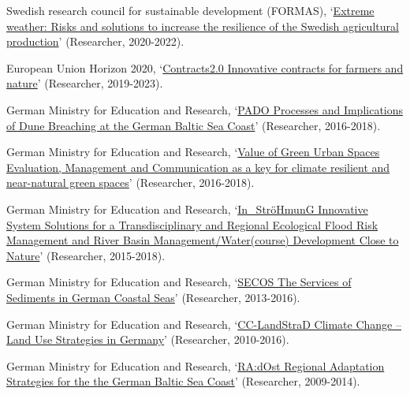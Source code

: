 \documentclass[paper=a4,fontsize=11pt]{scrartcl} %
\newcommand{\FundingEntry}[4]{
        \noindent #1, `#2' (#3, #4).}
\begin{document}
\begin{etaremune}

\item\FundingEntry {Swedish research council for sustainable development (FORMAS)}{\href{https://www.slu.se/en/departments/soil-environment/research/agricultural-water-management-/extreme-weather-and-resilience-in-swedish-agriculture/}{Extreme weather: Risks and solutions to increase the resilience of the Swedish agricultural production}}{Researcher}{2020-2022}

\item\FundingEntry {European Union Horizon 2020}{\href{www.project-contracts20.eu}{Contracts2.0 Innovative contracts for farmers and nature}}{Researcher}{2019-2023}

\item\FundingEntry {German Ministry for Education and Research}{\href{https://www.ioew.de/en/project-single/pado_processes_and_implications_of_dune_breaching_at_the_german_baltic_sea_coast/}{PADO Processes and Implications of Dune Breaching at the German Baltic Sea Coast}}{Researcher}{2016-2018}

\item\FundingEntry {German Ministry for Education and Research}{\href{https://www.ioew.de/en/project-single/value_of_green_urban_spaces/}{Value of Green Urban Spaces Evaluation, Management and Communication as a key for climate resilient and near-natural green spaces}}{Researcher}{2016-2018}


\item\FundingEntry {German Ministry for Education and Research}{\href{https://www.ioew.de/en/project-single/innovative_system_solutions_for_a_transdisciplinary_and_regional_ecological_flood_risk_management_an/}{In\_StröHmunG Innovative System Solutions for a Transdisciplinary and Regional Ecological Flood Risk Management and River Basin Management/Water(course) Development Close to Nature}}{Researcher}{2015-2018}

\item\FundingEntry {German Ministry for Education and Research}{\href{https://secos.deutsche-kuestenforschung.de/}{SECOS The Services of Sediments in German Coastal Seas}}{Researcher}{2013-2016}

\item\FundingEntry {German Ministry for Education and Research}{\href{https://www.cc-landstrad.de/en/}{CC-LandStraD Climate Change – Land Use Strategies in Germany}}{Researcher}{2010-2016}

\item\FundingEntry {German Ministry for Education and Research}{\href{http://www.klimzug-radost.de/en/info}{RA:dOst Regional Adaptation Strategies for the the German Baltic Sea Coast}}{Researcher}{2009-2014}


\end{etaremune}
\end{document}
